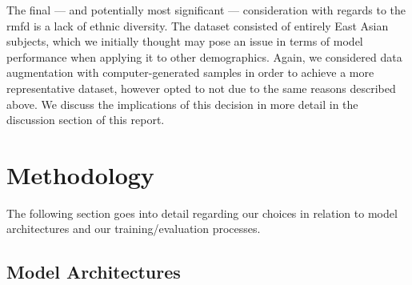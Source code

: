 \documentclass{article}
\begin{document}
The final --- and potentially most significant --- consideration with regards to the \gls{rmfd} is a lack of ethnic diversity. The dataset consisted of entirely East Asian subjects, which we initially thought may pose an issue in terms of model performance when applying it to other demographics. Again, we  considered data augmentation with computer-generated samples in order to achieve a more representative dataset, however opted to not due to the same reasons described above. We discuss the implications of this decision in more detail in the discussion section of this report.






\section{Methodology}
\label{sec:methods}

The following section goes into detail regarding our choices in relation to model architectures and our training/evaluation processes.

\subsection{Model Architectures}
\label{arch}
\end{document}
